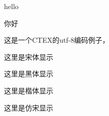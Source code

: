 \documentclass{article}
\begin{document}
 
hello

你好 

这是一个CTEX的utf-8编码例子，

{\songti 这里是宋体显示}

{\heiti 这里是黑体显示}

{\kaishu 这里是楷体显示}

{\fangsong 这里是仿宋显示}

    
\end{document}
